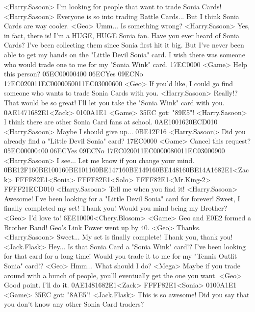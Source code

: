 <Harry.Sasoon> I'm looking for people that want to trade Sonia Cards! 
<Harry.Sasoon> Everyone is so into trading Battle Cards... 
But I think Sonia Cards are way cooler. 
<Geo> Umm... 
Is something wrong? 
<Harry.Sasoon> Yes, in fact, there is! I'm a HUGE, HUGE Sonia fan. 
Have you ever heard of Sonia Cards? 
I've been collecting them since Sonia first hit it big. 
But I've never been able to get my hands on the "Little Devil Sonia" card. 
I wish there was someone who would trade one to me for my "Sonia Wink" card. 
{17}{EC}{00}{00} 
<Game> Help this person? {05}{EC}{00}{00}{04}{00}  {06}{EC}Yes   {09}{EC}No 
{17}{EC}{02}{00}{11}{EC}{00}{00}{05}{00}{11}{EC}{03}{00}{06}{00}
<Geo> If you'd like, I could go find someone who wants to trade Sonia Cards with you. 
<Harry.Sasoon> Really!? That would be so great! 
I'll let you take the "Sonia Wink" card with you. 
{0A}{E1}{47}{16}{82}{E1}<Zack> {01}{00}{A1}{E1} 
<Game> {35}{EC} got: "{89}{E5}"! 
<Harry.Sasoon> I think there are other Sonia Card fans at school. 
{0A}{E1}{00}{16}{20}{EC}{D0}{10}
<Harry.Sasoon> Maybe I should give up... 
{0B}{E1}{2F}{16}
<Harry.Sasoon> Did you already find a "Little Devil Sonia" card? 
{17}{EC}{00}{00} 
<Game> Cancel this request? {05}{EC}{00}{00}{04}{00}  {06}{EC}Yes   {09}{EC}No 
{17}{EC}{02}{00}{11}{EC}{00}{00}{08}{00}{11}{EC}{03}{00}{09}{00}
<Harry.Sasoon> I see... Let me know if you change your mind. 
{0B}{E1}{2F}{16}{0B}{E1}{00}{16}{0B}{E1}{01}{16}{0B}{E1}{47}{16}{0B}{E1}{49}{16}{0B}{E1}{48}{16}{0B}{E1}{4A}{16}{82}{E1}<Zack> {FF}{FF}{82}{E1}<Sonia> {FF}{FF}{82}{E1}<Solo> {FF}{FF}{82}{E1}<Mr.King-2> {FF}{FF}{21}{EC}{D0}{10}
<Harry.Sasoon> Tell me when you find it! 
<Harry.Sasoon> Awesome! 
I've been looking for a "Little Devil Sonia" card for forever! 
Sweet, I finally completed my set! Thank you! 
Would you mind being my Brother? 
<Geo> I'd love to! 
{6E}{E1}{00}{00}<Chery.Blosom> 
<Game> Geo and {E0}{E2} formed a Brother Band! 
Geo's Link Power went up by 40. 
<Geo> Thanks. 
<Harry.Sasoon> Sweet... My set is finally complete! Thank you, thank you! 
<Jack.Flask> Hey... Is that Sonia Card a "Sonia Wink" card!? 
I've been looking for that card for a long time! 
Would you trade it to me for my "Tennis Outfit Sonia" card!? 
<Geo> Hmm... What should I do? 
<Mega> Maybe if you trade around with a bunch of people, you'll 
eventually get the one you want. 
<Geo> Good point. I'll do it. 
{0A}{E1}{48}{16}{82}{E1}<Zack> {FF}{FF}{82}{E1}<Sonia> {01}{00}{A1}{E1} 
<Game> {35}{EC} got: "{8A}{E5}"! 
<Jack.Flask> This is so awesome! 
Did you say that you don't know any other Sonia Card traders? 
